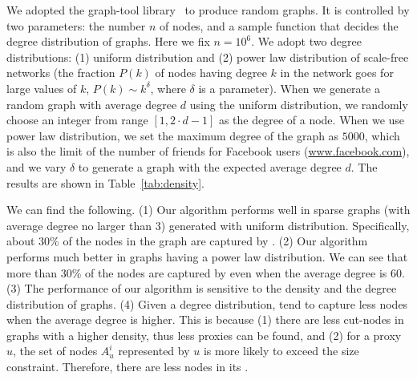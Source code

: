 We adopted the graph-tool library~\cite{peixoto_graph-tool_2014} to produce random graphs. It is controlled by two parameters: the number $n$ of nodes, and a sample function that decides the degree distribution of graphs. Here we fix $n=10^6$. We adopt two degree distributions: (1) uniform distribution and (2) power law distribution of scale-free networks  (the fraction $P(k)$ of nodes having degree $k$ in the network goes for large values of $k$, \ie  $P(k)\sim k^\delta$, where $\delta$ is a parameter). When we generate a random graph with average degree $d$ using the uniform distribution, we randomly choose an integer from range $[1, 2\cdot d-1]$ as the degree of a node. When we use power law distribution, we set the maximum degree of the graph as $5000$, which is also the limit of the number of friends for Facebook users (\url{www.facebook.com}), and we vary $\delta$ to generate a graph with the expected average degree $d$. The results are shown in Table~\ref{tab:density}.

We can find the following. (1) Our algorithm performs well in sparse graphs (with average degree no larger than 3) generated with uniform distribution. Specifically, about 30\% of the nodes in the graph are captured by \dras. (2) Our algorithm performs much better in graphs having a power law distribution. We can see that more than 30\% of the nodes are captured by \dras even when the average degree is 60. (3) The performance of our algorithm is sensitive to the density and the degree distribution of graphs. (4) Given a degree distribution, \dras tend to capture less nodes when the average degree is higher. This is because (1) there are less cut-nodes in graphs with a higher density, thus less proxies can be found, and (2) for a proxy $u$, the set of nodes $A_u^i$ represented by $u$ is more likely to exceed the size constraint. Therefore, there are less nodes in its \dra. %


